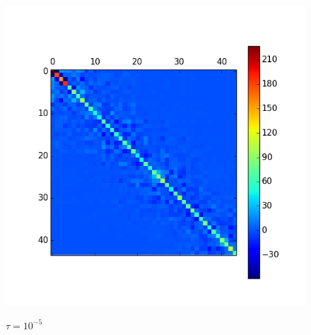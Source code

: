 \begin{figure}[h]
  \centering
  \includegraphics[scale = 0.5]{./Figures/SmallProblemSmallTau.png}\\
  \caption{$\tau = 10^{-5}$}
  \label{f:SmallProblemSmallTau}
\end{figure}







